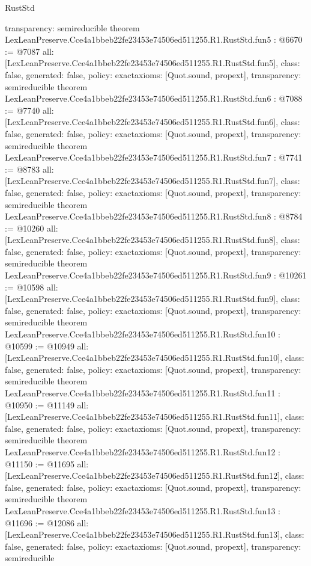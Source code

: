 \begin{lexlean}{RustStd}
\begin{coremodule}
{  transparency: semireducible
}
theorem LexLeanPreserve.Cce4a1bbeb22fe23453e74506ed511255.R1.RustStd.fun5 : @6670 := @7087 {
  all: [LexLeanPreserve.Cce4a1bbeb22fe23453e74506ed511255.R1.RustStd.fun5],
  class: false,
  generated: false,
  policy: exact{axioms: [Quot.sound, propext]},
  transparency: semireducible
}
theorem LexLeanPreserve.Cce4a1bbeb22fe23453e74506ed511255.R1.RustStd.fun6 : @7088 := @7740 {
  all: [LexLeanPreserve.Cce4a1bbeb22fe23453e74506ed511255.R1.RustStd.fun6],
  class: false,
  generated: false,
  policy: exact{axioms: [Quot.sound, propext]},
  transparency: semireducible
}
theorem LexLeanPreserve.Cce4a1bbeb22fe23453e74506ed511255.R1.RustStd.fun7 : @7741 := @8783 {
  all: [LexLeanPreserve.Cce4a1bbeb22fe23453e74506ed511255.R1.RustStd.fun7],
  class: false,
  generated: false,
  policy: exact{axioms: [Quot.sound, propext]},
  transparency: semireducible
}
theorem LexLeanPreserve.Cce4a1bbeb22fe23453e74506ed511255.R1.RustStd.fun8 : @8784 := @10260 {
  all: [LexLeanPreserve.Cce4a1bbeb22fe23453e74506ed511255.R1.RustStd.fun8],
  class: false,
  generated: false,
  policy: exact{axioms: [Quot.sound, propext]},
  transparency: semireducible
}
theorem LexLeanPreserve.Cce4a1bbeb22fe23453e74506ed511255.R1.RustStd.fun9 : @10261 := @10598 {
  all: [LexLeanPreserve.Cce4a1bbeb22fe23453e74506ed511255.R1.RustStd.fun9],
  class: false,
  generated: false,
  policy: exact{axioms: [Quot.sound, propext]},
  transparency: semireducible
}
theorem LexLeanPreserve.Cce4a1bbeb22fe23453e74506ed511255.R1.RustStd.fun10 : @10599 := @10949 {
  all: [LexLeanPreserve.Cce4a1bbeb22fe23453e74506ed511255.R1.RustStd.fun10],
  class: false,
  generated: false,
  policy: exact{axioms: [Quot.sound, propext]},
  transparency: semireducible
}
theorem LexLeanPreserve.Cce4a1bbeb22fe23453e74506ed511255.R1.RustStd.fun11 : @10950 := @11149 {
  all: [LexLeanPreserve.Cce4a1bbeb22fe23453e74506ed511255.R1.RustStd.fun11],
  class: false,
  generated: false,
  policy: exact{axioms: [Quot.sound, propext]},
  transparency: semireducible
}
theorem LexLeanPreserve.Cce4a1bbeb22fe23453e74506ed511255.R1.RustStd.fun12 : @11150 := @11695 {
  all: [LexLeanPreserve.Cce4a1bbeb22fe23453e74506ed511255.R1.RustStd.fun12],
  class: false,
  generated: false,
  policy: exact{axioms: [Quot.sound, propext]},
  transparency: semireducible
}
theorem LexLeanPreserve.Cce4a1bbeb22fe23453e74506ed511255.R1.RustStd.fun13 : @11696 := @12086 {
  all: [LexLeanPreserve.Cce4a1bbeb22fe23453e74506ed511255.R1.RustStd.fun13],
  class: false,
  generated: false,
  policy: exact{axioms: [Quot.sound, propext]},
  transparency: semireducible
}
\end{coremodule}
\end{lexlean}
